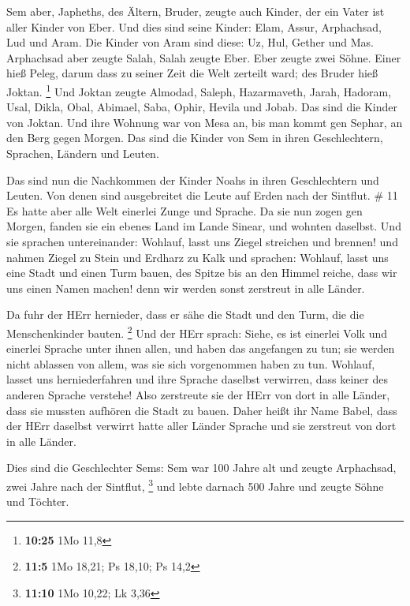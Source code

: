  Sem aber, Japheths, des Ältern, Bruder, zeugte auch
Kinder, der ein Vater ist aller Kinder von Eber.  Und dies
sind seine Kinder: Elam, Assur, Arphachsad, Lud und Aram. 
Die Kinder von Aram sind diese: Uz, Hul, Gether und Mas. 
Arphachsad aber zeugte Salah, Salah zeugte Eber.  Eber
zeugte zwei Söhne. Einer hieß Peleg, darum dass zu seiner Zeit die Welt
zerteilt ward; des Bruder hieß Joktan. \footnote{\textbf{10:25} 1Mo 11,8}
 Und Joktan zeugte Almodad, Saleph, Hazarmaveth, Jarah,
 Hadoram, Usal, Dikla,  Obal, Abimael, Saba,
 Ophir, Hevila und Jobab. Das sind die Kinder von Joktan.
 Und ihre Wohnung war von Mesa an, bis man kommt gen
Sephar, an den Berg gegen Morgen.  Das sind die Kinder von
Sem in ihren Geschlechtern, Sprachen, Ländern und Leuten.

 Das sind nun die Nachkommen der Kinder Noahs in ihren
Geschlechtern und Leuten. Von denen sind ausgebreitet die Leute auf
Erden nach der Sintflut. \# 11  Es hatte aber alle Welt
einerlei Zunge und Sprache.  Da sie nun zogen gen Morgen,
fanden sie ein ebenes Land im Lande Sinear, und wohnten daselbst.
 Und sie sprachen untereinander: Wohlauf, lasst uns Ziegel
streichen und brennen! und nahmen Ziegel zu Stein und Erdharz zu Kalk
 und sprachen: Wohlauf, lasst uns eine Stadt und einen Turm
bauen, des Spitze bis an den Himmel reiche, dass wir uns einen Namen
machen! denn wir werden sonst zerstreut in alle Länder.

 Da fuhr der HErr hernieder, dass er sähe die Stadt und den
Turm, die die Menschenkinder bauten. \footnote{\textbf{11:5} 1Mo 18,21;
  Ps 18,10; Ps 14,2}  Und der HErr sprach: Siehe, es ist
einerlei Volk und einerlei Sprache unter ihnen allen, und haben das
angefangen zu tun; sie werden nicht ablassen von allem, was sie sich
vorgenommen haben zu tun.  Wohlauf, lasset uns
herniederfahren und ihre Sprache daselbst verwirren, dass keiner des
anderen Sprache verstehe!  Also zerstreute sie der HErr von
dort in alle Länder, dass sie mussten aufhören die Stadt zu bauen.
 Daher heißt ihr Name Babel, dass der HErr daselbst verwirrt
hatte aller Länder Sprache und sie zerstreut von dort in alle Länder.

 Dies sind die Geschlechter Sems: Sem war 100 Jahre alt und
zeugte Arphachsad, zwei Jahre nach der Sintflut, \footnote{\textbf{11:10}
  1Mo 10,22; Lk 3,36}  und lebte darnach 500 Jahre und
zeugte Söhne und Töchter.

